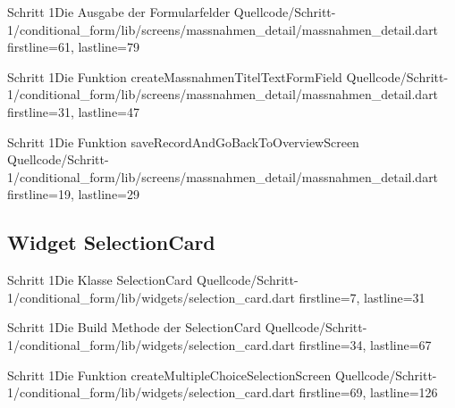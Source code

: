 {\begin{alexlisting}{Schritt 1}{Die Ausgabe der Formularfelder}
  {Quellcode/Schritt-1/conditional_form/lib/screens/massnahmen_detail/massnahmen_detail.dart}
  {firstline=61, lastline=79}
  \label{lst:Schritt1AusgabeDerFormularfelder}
\end{alexlisting}

\begin{alexlisting}{Schritt 1}{Die Funktion createMassnahmenTitelTextFormField}
  {Quellcode/Schritt-1/conditional_form/lib/screens/massnahmen_detail/massnahmen_detail.dart}
  {firstline=31, lastline=47}
  \label{lst:Schritt1DieFunktionCreateMassnahmenTitelTextFormField}
\end{alexlisting}

\begin{alexlisting}{Schritt 1}{Die Funktion saveRecordAndGoBackToOverviewScreen}
  {Quellcode/Schritt-1/conditional_form/lib/screens/massnahmen_detail/massnahmen_detail.dart}
  {firstline=19, lastline=29}
  \label{lst:Schritt1SaveRecordAndGoBackToOverviewScreen}
\end{alexlisting}






\cleardoublepage
\subsection{Widget SelectionCard}




\begin{alexlisting}{Schritt 1}{Die Klasse SelectionCard}
  {Quellcode/Schritt-1/conditional_form/lib/widgets/selection_card.dart}
  {firstline=7, lastline=31}
  \label{lst:Schritt1KlasseSelectionCard}
\end{alexlisting}

\begin{alexlisting}{Schritt 1}{Die Build Methode der SelectionCard}
  {Quellcode/Schritt-1/conditional_form/lib/widgets/selection_card.dart}
  {firstline=34, lastline=67}
  \label{lst:Schritt1BuildMethodeDerSelectionCard}
\end{alexlisting}

\begin{alexlisting}{Schritt 1}{Die Funktion createMultipleChoiceSelectionScreen}
  {Quellcode/Schritt-1/conditional_form/lib/widgets/selection_card.dart}
  {firstline=69, lastline=126}
  \label{lst:Schritt1FunktionCreateMultipleChoiceSelectionScreen}
\end{alexlisting}


}

